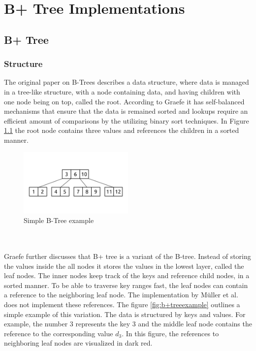 \chapter{B+ Tree Implementations}\label{chapter:b-tree_implementations}
\section{B+ Tree}
\subsection{Structure}
The original paper on B-Trees \parencite{ogbtree} describes a data structure, where data is managed in a tree-like structure, with a node containing data, and having children with one node being on top, called the root. According to Graefe \parencite{modernbtree} it has self-balanced mechanisms that ensure that the data is remained sorted and lookups require an efficient amount of comparisons by the utilizing binary sort techniques. In Figure \ref{fig:btreeexample} the root node contains three values and references the children in a sorted manner.
\begin{figure}[h]
  \centering
  \includegraphics[width=0.5\textwidth]{images/an-example-b-tree.png}
  \caption{Simple B-Tree example \parencite{btreeexample}}
  \label{fig:btreeexample}
\end{figure}
\\\\
Graefe \parencite{modernbtree} further discusses that B+ tree is a variant of the B-tree. Instead of storing the values inside the all nodes it stores the values in the lowest layer, called the leaf nodes. The inner nodes keep track of the keys and reference child nodes, in a sorted manner. To be able to traverse key ranges fast, the leaf nodes can contain a reference to the neighboring leaf node. The implementation by Müller et al. \parencite{mueller2024} does not implement these references. The figure \ref{fig:b+treeexample} outlines a simple example of this variation. The data is structured by keys and values. For example, the number $3$ represents the key $3$ and the middle leaf node contains the reference to the corresponding value $d_3$. In this figure, the references to neighboring leaf nodes are visualized in dark red.


